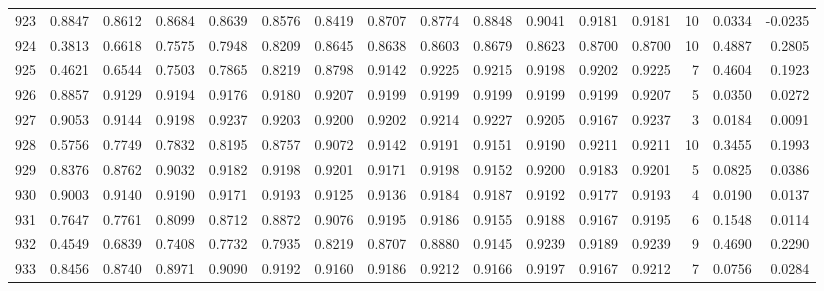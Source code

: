 \begin{tabular}{lrrrrrrrrrrrrrrr}
923 &      0.8847 &  0.8612 &  0.8684 &  0.8639 &  0.8576 &  0.8419 &  0.8707 &  0.8774 &  0.8848 &  0.9041 &   0.9181 &     0.9181 &     10 &                    0.0334 &                    -0.0235 \\
924 &      0.3813 &  0.6618 &  0.7575 &  0.7948 &  0.8209 &  0.8645 &  0.8638 &  0.8603 &  0.8679 &  0.8623 &   0.8700 &     0.8700 &     10 &                    0.4887 &                     0.2805 \\
925 &      0.4621 &  0.6544 &  0.7503 &  0.7865 &  0.8219 &  0.8798 &  0.9142 &  0.9225 &  0.9215 &  0.9198 &   0.9202 &     0.9225 &      7 &                    0.4604 &                     0.1923 \\
926 &      0.8857 &  0.9129 &  0.9194 &  0.9176 &  0.9180 &  0.9207 &  0.9199 &  0.9199 &  0.9199 &  0.9199 &   0.9199 &     0.9207 &      5 &                    0.0350 &                     0.0272 \\
927 &      0.9053 &  0.9144 &  0.9198 &  0.9237 &  0.9203 &  0.9200 &  0.9202 &  0.9214 &  0.9227 &  0.9205 &   0.9167 &     0.9237 &      3 &                    0.0184 &                     0.0091 \\
928 &      0.5756 &  0.7749 &  0.7832 &  0.8195 &  0.8757 &  0.9072 &  0.9142 &  0.9191 &  0.9151 &  0.9190 &   0.9211 &     0.9211 &     10 &                    0.3455 &                     0.1993 \\
929 &      0.8376 &  0.8762 &  0.9032 &  0.9182 &  0.9198 &  0.9201 &  0.9171 &  0.9198 &  0.9152 &  0.9200 &   0.9183 &     0.9201 &      5 &                    0.0825 &                     0.0386 \\
930 &      0.9003 &  0.9140 &  0.9190 &  0.9171 &  0.9193 &  0.9125 &  0.9136 &  0.9184 &  0.9187 &  0.9192 &   0.9177 &     0.9193 &      4 &                    0.0190 &                     0.0137 \\
931 &      0.7647 &  0.7761 &  0.8099 &  0.8712 &  0.8872 &  0.9076 &  0.9195 &  0.9186 &  0.9155 &  0.9188 &   0.9167 &     0.9195 &      6 &                    0.1548 &                     0.0114 \\
932 &      0.4549 &  0.6839 &  0.7408 &  0.7732 &  0.7935 &  0.8219 &  0.8707 &  0.8880 &  0.9145 &  0.9239 &   0.9189 &     0.9239 &      9 &                    0.4690 &                     0.2290 \\
933 &      0.8456 &  0.8740 &  0.8971 &  0.9090 &  0.9192 &  0.9160 &  0.9186 &  0.9212 &  0.9166 &  0.9197 &   0.9167 &     0.9212 &      7 &                    0.0756 &                     0.0284 \\

\end{tabular}
